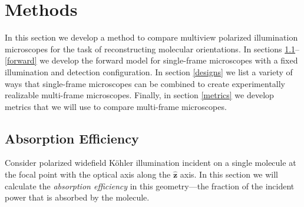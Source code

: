 \documentclass[10pt]{article}
\providecommand{\mh}[1]{\mathbf{\hat{#1}}}
\begin{document}
\section{Methods}\label{methods}
In this section we develop a method to compare multiview polarized illumination
microscopes for the task of reconstructing molecular orientations. In sections
\ref{excitation}--\ref{forward} we develop the forward model for single-frame
microscopes with a fixed illumination and detection configuration. In section
\ref{designs} we list a variety of ways that single-frame microscopes can be
combined to create experimentally realizable multi-frame microscopes. Finally,
in section \ref{metrics} we develop metrics that we will use to compare
multi-frame microscopes.

\subsection{Absorption Efficiency}\label{excitation}
Consider polarized widefield K\"ohler illumination incident on a single
molecule at the focal point with the optical axis along the $\mh{z}$ axis. In
this section we will calculate the \emph{absorption efficiency} in this
geometry---the fraction of the incident power that is absorbed by the molecule.
\end{document}
